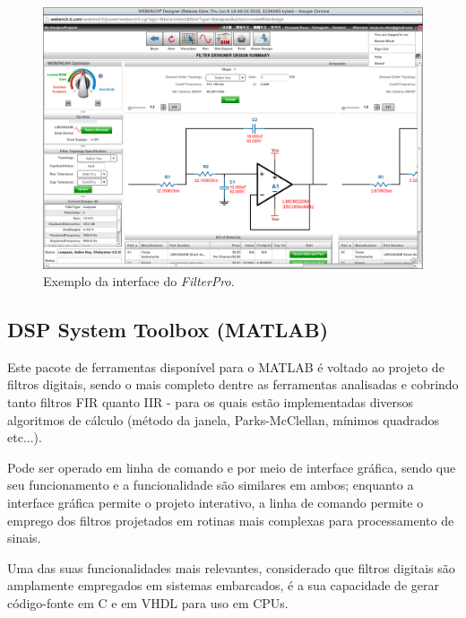 \begin{figure}[H] 
\centering \includegraphics[scale=0.33]{images/screens/fp_example} \caption{Exemplo da interface do \textit{FilterPro}.} 
\label{fig:fp_example} 
\end{figure}

\subsection{DSP System Toolbox (MATLAB)}

Este pacote de ferramentas disponível para o MATLAB é voltado ao projeto de filtros digitais, sendo o mais completo dentre as ferramentas analisadas e cobrindo tanto filtros FIR quanto IIR - para os quais estão implementadas diversos algoritmos de cálculo (método da janela, Parks-McClellan, mínimos quadrados etc...).

Pode ser operado em linha de comando e por meio de interface gráfica, sendo que seu funcionamento e a funcionalidade são similares em ambos; enquanto a interface gráfica permite o projeto interativo, a linha de comando permite o emprego dos filtros projetados em rotinas mais complexas para processamento de sinais.

Uma das suas funcionalidades mais relevantes, considerado que filtros digitais são amplamente empregados em sistemas embarcados, é a sua capacidade de gerar código-fonte em C e em VHDL para uso em CPUs.


